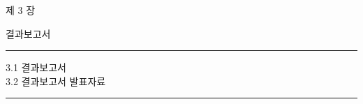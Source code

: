 
\begin{titlepage}
\thispagestyle{empty}

\centering

\vspace{1cm}

\Huge 제 3 장

\vspace{2.5cm}

{\fontsize{42pt}{42pt}
    결과보고서
    \par
}

\vspace{1cm}
\rule{9cm}{3.5pt}
\vspace{1cm}

\begin{minipage}{0.5\textwidth}
    \raggedright
    \Large 3.1 결과보고서 \\
    3.2 결과보고서 발표자료 \\
\end{minipage} \par
\vspace{1cm}
\rule{9cm}{3.5pt}
\end{titlepage}